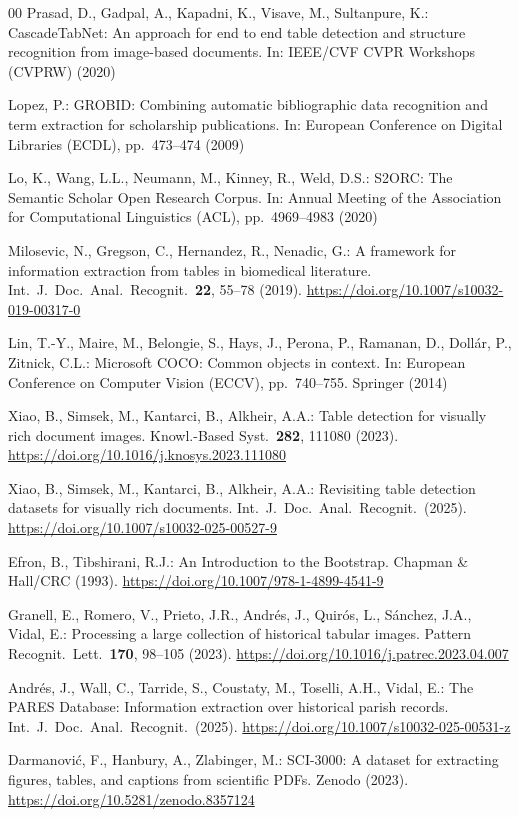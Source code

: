 \documentclass[pdflatex,sn-mathphys-num,iicol]{sn-jnl}
\begin{document}
\begin{thebibliography}{00}
Prasad, D., Gadpal, A., Kapadni, K., Visave, M., Sultanpure, K.:
CascadeTabNet: An approach for end to end table detection and structure recognition
from image-based documents.
In: IEEE/CVF CVPR Workshops (CVPRW) (2020)

Lopez, P.:
GROBID: Combining automatic bibliographic data recognition and term extraction for
scholarship publications.
In: European Conference on Digital Libraries (ECDL), pp.~473--474 (2009)

Lo, K., Wang, L.L., Neumann, M., Kinney, R., Weld, D.S.:
S2ORC: The Semantic Scholar Open Research Corpus.
In: Annual Meeting of the Association for Computational Linguistics (ACL),
pp.~4969--4983 (2020)

Milosevic, N., Gregson, C., Hernandez, R., Nenadic, G.:
A framework for information extraction from tables in biomedical literature.
Int.\ J.\ Doc.\ Anal.\ Recognit.\ \textbf{22}, 55--78 (2019).
\url{https://doi.org/10.1007/s10032-019-00317-0}

Lin, T.-Y., Maire, M., Belongie, S., Hays, J., Perona, P., Ramanan, D.,
Doll\'{a}r, P., Zitnick, C.L.:
Microsoft COCO: Common objects in context.
In: European Conference on Computer Vision (ECCV), pp.~740--755. Springer (2014)

Xiao, B., Simsek, M., Kantarci, B., Alkheir, A.A.:
Table detection for visually rich document images.
Knowl.-Based Syst.\ \textbf{282}, 111080 (2023).
\url{https://doi.org/10.1016/j.knosys.2023.111080}

Xiao, B., Simsek, M., Kantarci, B., Alkheir, A.A.:
Revisiting table detection datasets for visually rich documents.
Int.\ J.\ Doc.\ Anal.\ Recognit.\ (2025).
\url{https://doi.org/10.1007/s10032-025-00527-9}

Efron, B., Tibshirani, R.J.:
An Introduction to the Bootstrap.
Chapman \& Hall/CRC (1993).
\url{https://doi.org/10.1007/978-1-4899-4541-9}

Granell, E., Romero, V., Prieto, J.R., Andr\'{e}s, J., Quir\'{o}s, L.,
S\'{a}nchez, J.A., Vidal, E.:
Processing a large collection of historical tabular images.
Pattern Recognit.\ Lett.\ \textbf{170}, 98--105 (2023).
\url{https://doi.org/10.1016/j.patrec.2023.04.007}

Andr\'{e}s, J., Wall, C., Tarride, S., Coustaty, M., Toselli, A.H., Vidal, E.:
The PARES Database: Information extraction over historical parish records.
Int.\ J.\ Doc.\ Anal.\ Recognit.\ (2025).
\url{https://doi.org/10.1007/s10032-025-00531-z}

Darmanovi\'{c}, F., Hanbury, A., Zlabinger, M.:
SCI-3000: A dataset for extracting figures, tables, and captions from scientific PDFs.
Zenodo (2023).
\url{https://doi.org/10.5281/zenodo.8357124}

\end{thebibliography}
\end{document}
